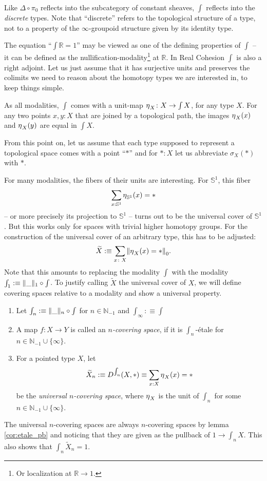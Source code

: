 \documentclass[9pt,twosided]{amsart}
\newcommand{\shape}{\int}
\newcommand{\bN}{\mathbb N}
\newcommand{\bR}{\mathbb R}
\newcommand{\bS}{\mathbb S}
\begin{document}
Like $\Delta\circ\pi_0$ reflects into the subcategory of constant sheaves, $\shape$ reflects into the \emph{discrete} types.
Note that ``discrete'' refers to the topological structure of a type, 
not to a property of the $\infty$-groupoid structure given by its identity type.

The equation ``$\shape \bR=1$'' may be viewed as one of the defining properties of $\shape$
-- it can be defined as the nullification-modality\footnote{Or localization at $\bR\to 1$.} at $\bR$.
In Real Cohesion $\shape$ is also a right adjoint.
Let us just assume that it has surjective units and preserves the colimits we need to reason about the homotopy types we are interested in, to keep things simple.

As all modalities, $\shape$ comes with a unit-map $\modalunit_X\colon X \to \shape X$, for any type $X$.
For any two points $x,y: X$ that are joined by a topological path, 
the images ${\eta_{}}_X(x)$ and ${\eta_{}}_X(y)$ are equal in $\shape X$.

From this point on, 
let us assume that each type supposed to represent a topological space comes with a point ``$\ast$''
and for $\ast:X$ let us abbreviate $\sigma_X(\ast)$ with $\ast$.
  
For many modalities, the fibers of their units are interesting.
For $\bS^{1}$, this fiber
\[ \sum_{x:\bS^{1}}\modalunit_{\bS^{1}}(x)=\ast \]
-- or more precisely its projection to $\bS^{1}$ -- turns out to be the universal cover of $\bS^{1}$.
But this works only for spaces with trivial higher homotopy groups. 
For the construction of the universal cover of an arbitrary type, this has to be adjusted:
\[ \widetilde{X}:\equiv \sum_{x\colon X} \trunc{0}{\modalunit_X(x)=\ast}. \]
Note that this amounts to replacing the modality $\shape$ with the modality $\shape_1:\equiv\trunc{1}{\_}\circ\shape$.
To justify calling $\widetilde{X}$ the universal cover of $X$, 
we will define covering spaces relative to a modality and show a universal property.

\begin{defn}
  \begin{enumerate}
  \item Let $\shape_n:\equiv\trunc{n}{\_}\circ\shape$ for $n\in\bN_{-1}$ and $\shape_\infty:\equiv\shape$
  \item A map $f:X\to Y$ is called an \emph{$n$-covering space}, if it is $\shape_n$-étale for $n\in\bN_{-1}\cup\{\infty\}$.
  \item For a pointed type $X$, let
    \[ \widetilde{X}_n:\equiv D^{\shape_n}(X,\ast) \equiv \sum_{x:X}\modalunit_X(x)=\ast \]
    be the \emph{universal $n$-covering space}, where ${\eta_{}}_X$ is the unit of $\shape_n$ for some $n\in\bN_{-1}\cup\{\infty\}$.
  \end{enumerate}
\end{defn}
The universal $n$-covering spaces are always $n$-covering spaces by lemma \ref{cor:etale_pb} and noticing that they are given as the pullback of $1\to\shape_nX$.
This also shows that $\shape_n \widetilde{X}_n = 1$.
\end{document}
